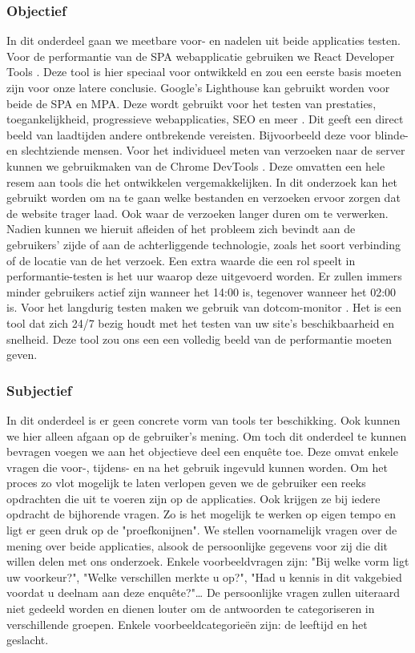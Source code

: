 \documentclass{hogent-article}
\begin{document}
\subsubsection{Objectief}
In dit onderdeel gaan we meetbare voor- en nadelen uit beide applicaties testen.
Voor de performantie van de SPA webapplicatie gebruiken we React Developer Tools \autocite{RDT2022}.
Deze tool is hier speciaal voor ontwikkeld en zou een eerste basis moeten zijn voor onze latere conclusie.
Google's Lighthouse kan gebruikt worden voor beide de SPA en MPA.
Deze wordt gebruikt voor het testen van prestaties, toegankelijkheid, progressieve webapplicaties, SEO en meer \autocite{GoogleLighthouse2022}.
Dit geeft een direct beeld van laadtijden andere ontbrekende vereisten.
Bijvoorbeeld deze voor blinde- en slechtziende mensen.
Voor het individueel meten van verzoeken naar de server kunnen we gebruikmaken van de Chrome DevTools \autocite{GoogleDevTools2016}.
Deze omvatten een hele resem aan tools die het ontwikkelen vergemakkelijken.
In dit onderzoek kan het gebruikt worden om na te gaan welke bestanden en verzoeken ervoor zorgen dat de website trager laad.
Ook waar de verzoeken langer duren om te verwerken.
Nadien kunnen we hieruit afleiden of het probleem zich bevindt aan de gebruikers' zijde of aan de achterliggende technologie, zoals het soort verbinding of de locatie van de het verzoek.
Een extra waarde die een rol speelt in performantie-testen is het uur waarop deze uitgevoerd worden.
Er zullen immers minder gebruikers actief zijn wanneer het 14:00 is, tegenover wanneer het 02:00 is.
Voor het langdurig testen maken we gebruik van dotcom-monitor \autocite{dotcom-monitor2022}.
Het is een tool dat zich 24/7 bezig houdt met het testen van uw site's beschikbaarheid en snelheid.
Deze tool zou ons een een volledig beeld van de performantie moeten geven.

\subsubsection{Subjectief}
In dit onderdeel is er geen concrete vorm van tools ter beschikking.
Ook kunnen we hier alleen afgaan op de gebruiker's mening.
Om toch dit onderdeel te kunnen bevragen voegen we aan het objectieve deel een enquête toe.
Deze omvat enkele vragen die voor-, tijdens- en na het gebruik ingevuld kunnen worden.
Om het proces zo vlot mogelijk te laten verlopen geven we de gebruiker een reeks opdrachten die uit te voeren zijn op de applicaties.
Ook krijgen ze bij iedere opdracht de bijhorende vragen.
Zo is het mogelijk te werken op eigen tempo en ligt er geen druk op de "proefkonijnen".
We stellen voornamelijk vragen over de mening over beide applicaties, alsook de persoonlijke gegevens voor zij die dit willen delen met ons onderzoek.
Enkele voorbeeldvragen zijn:
"Bij welke vorm ligt uw voorkeur?",
"Welke verschillen merkte u op?",
"Had u kennis in dit vakgebied voordat u deelnam aan deze enquête?"\dots
De persoonlijke vragen zullen uiteraard niet gedeeld worden en dienen louter om de antwoorden te categoriseren in verschillende groepen.
Enkele voorbeeldcategorieën zijn: de leeftijd en het geslacht.
\end{document}

